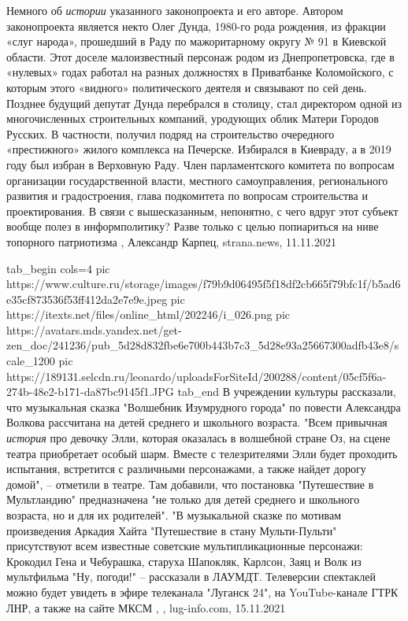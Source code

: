 Немного об \emph{истории} указанного законопроекта и его авторе. Автором законопроекта
является некто Олег Дунда, 1980-го рода рождения, из фракции «слуг народа»,
прошедший в Раду по мажоритарному округу № 91 в Киевской области. Этот доселе
малоизвестный персонаж родом из Днепропетровска, где в «нулевых» годах работал
на разных должностях в Приватбанке Коломойского, с которым этого «видного»
политического деятеля и связывают по сей день. Позднее будущий депутат Дунда
перебрался в столицу, стал директором одной из многочисленных строительных
компаний, уродующих облик Матери Городов Русских. В частности, получил подряд
на строительство очередного «престижного» жилого комплекса на Печерске.
Избирался в Киевраду, а в 2019 году был избран в Верховную Раду. Член
парламентского комитета по вопросам организации государственной власти,
местного самоуправления, регионального развития и градостроения, глава
подкомитета по вопросам строительства и проектирования.  В связи с
вышесказанным, непонятно, с чего вдруг этот субъект вообще полез в
информполитику? Разве только с целью попиариться на ниве топорного патриотизма
, 
Александр Карпец, strana.news, 11.11.2021

\ifcmt
  tab_begin cols=4
		pic https://www.culture.ru/storage/images/f79b9d06495f5f18df2cb665f79bfc1f/b5ad6e35cf873536f53ff412da2e7e9e.jpeg
		pic https://itexts.net/files/online_html/202246/i_026.png
		pic https://avatars.mds.yandex.net/get-zen_doc/241236/pub_5d28d832fbe6e700b443b7c3_5d28e93a25667300adfb43e8/scale_1200
		pic https://189131.selcdn.ru/leonardo/uploadsForSiteId/200288/content/05cf5f6a-274b-48e2-b171-da87bc9145f1.JPG
  tab_end
\fi
В учреждении культуры рассказали, что музыкальная сказка "Волшебник Изумрудного
города" по повести Александра Волкова рассчитана на детей среднего и школьного
возраста.  "Всем привычная \emph{история} про девочку Элли, которая оказалась в
волшебной стране Оз, на сцене театра приобретает особый шарм. Вместе с
телезрителями Элли будет проходить испытания, встретится с различными
персонажами, а также найдет дорогу домой", – отметили в театре.  Там добавили,
что постановка "Путешествие в Мультландию" предназначена "не только для детей
среднего и школьного возраста, но и для их родителей".  "В музыкальной сказке
по мотивам произведения Аркадия Хайта "Путешествие в стану Мульти-Пульти"
присутствуют всем известные советские мультипликационные персонажи: Крокодил
Гена и Чебурашка, старуха Шапокляк, Карлсон, Заяц и Волк из мультфильма "Ну,
погоди!" – рассказали в ЛАУМДТ.  Телеверсии спектаклей можно будет увидеть в
эфире телеканала "Луганск 24", на YouTube-канале ГТРК ЛНР, а также на сайте
МКСМ
, 
, lug-info.com, 15.11.2021

